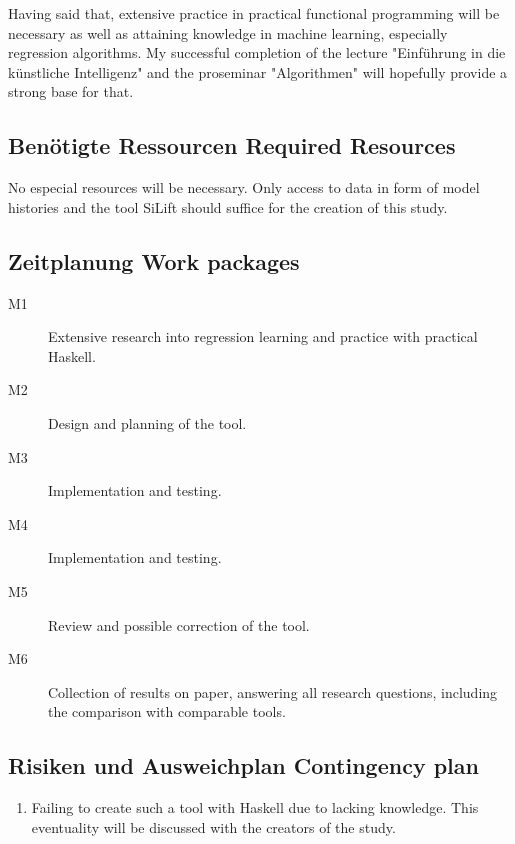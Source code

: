 \documentclass[10pt,a4paper,oneside]{scrartcl}
\begin{document}
Having said that, extensive practice in practical functional programming will be necessary as well as attaining knowledge in machine learning, especially regression algorithms. My successful completion of the lecture "Einführung in die künstliche Intelligenz" and the proseminar "Algorithmen" will hopefully provide a strong base for that.

\subsection{
	{Benötigte Ressourcen}
	{Required Resources}}
\label{sub:resources}
No especial resources will be necessary. Only access to data in form of model histories and the tool SiLift should suffice for the creation of this study.

\subsection{
	{Zeitplanung}
	{Work packages}}
\label{sub:wp}


\begin{description}
\item[M1] Extensive research into regression learning and practice with practical Haskell.
\item[M2] Design and planning of the tool.
\item[M3] Implementation and testing.
\item[M4] Implementation and testing.
\item[M5] Review and possible correction of the tool.
\item[M6] Collection of results on paper, answering all research questions, including the comparison with comparable tools.
\end{description}

\subsection{
	{Risiken und Ausweichplan}
	{Contingency plan}}
\label{sub:contingency}


\begin{enumerate}
\item Failing to create such a tool with Haskell due to lacking knowledge. This eventuality will be discussed with the creators of the study.
\end{enumerate}

\nocite{*}
\printbibliography
\end{document}
